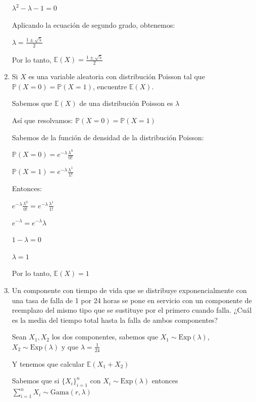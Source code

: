 \documentclass[11pt,a4paper]{report}
\begin{document}
\begin{enumerate}
{			 $\lambda^{2} - \lambda - 1 = 0$
			 
			 Aplicando la ecuación de segundo grado, obtenemos:
			 
			 $\lambda = \frac{1 \pm \sqrt{5}}{2}$
			 
			 Por lo tanto, $ \mathbb{E}(X) = \frac{1 \pm \sqrt{5}}{2}$\\
			
		}

		\item{
			Si $X$ es una variable aleatoria con distribución Poisson tal que
			$\mathbb{P}(X = 0) = \mathbb{P}(X = 1)$, encuentre $\mathbb{E}(X)$.
				
			Sabemos que $\mathbb{E}(X)$ de una distribución Poisson es $\lambda$
			
			Así que resolvamos: $\mathbb{P}(X = 0) = \mathbb{P}(X = 1)$
			
			Sabemos de la función de densidad de la distribución Poisson:
			
			$\mathbb{P}(X = 0) = e^{-\lambda} \frac{\lambda^{0}}{0!}$
			
			$\mathbb{P}(X = 1) = e^{-\lambda} \frac{\lambda^{1}}{1!}$

			
			Entonces:
			
			$e^{-\lambda} \frac{\lambda^{0}}{0!} = e^{-\lambda} \frac{\lambda^{1}}{1!}$
			
			$e^{-\lambda}  =  e^{-\lambda} \lambda$
			
			$1 - \lambda =  0$
						
			$\lambda = 1$
		
			Por lo tanto, $ \mathbb{E}(X) = 1$\\
		}

		\item{
			Un componente con tiempo de vida que se distribuye exponencialmente
			con una tasa de falla de 1 por 24 horas se pone en servicio con un
			componente de reemplazo del mismo tipo que se sustituye por el
			primero cuando falla. ¿Cuál es la media del tiempo total hasta la
			falla de ambos componentes?
			
			Sean $X_{1}, X_{2}$ los dos componentes, sabemos que $X_{1} \sim \text{Exp}(\lambda)$, $X_{2} \sim \text{Exp}(\lambda)$  y que $\lambda = \frac{1}{24}$
			
			Y tenemos que calcular $\mathbb{E}(X_{1} + X_{2})$ 
			
			Sabemos que si $\{X_i\}_{i=1}^{n}$ con $X_{i} \sim \text{Exp}(\lambda)$ entonces $\sum_{i=1}^{n}  X_{i} \sim \text{Gama}(r, \lambda) $
			
}
\end{enumerate}
\end{document}
